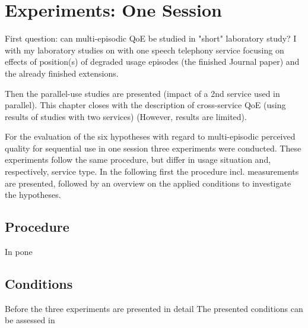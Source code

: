 \chapter{Experiments: One Session}\label{chap:lab}
\begin{chapter-abstract}
First question: can multi-episodic QoE be studied in "short" laboratory study?
I with my laboratory studies on with one speech telephony service focusing on effects of position(s) of degraded usage episodes (the finished Journal paper) and the already finished extensions.

Then the parallel-use studies are presented (impact of a 2nd service used in parallel).
This chapter closes with the description of cross-service QoE (using results of studies with two services) (However, results are limited).
\end{chapter-abstract}

For the evaluation of the six hypotheses with regard to multi-episodic perceived quality for sequential use in one session three experiments were conducted.
These experiments follow the same procedure, but differ in usage situation and, respectively, service type.
In the following first the procedure incl. measurements are presented, followed by an overview on the applied conditions to investigate the hypotheses.

\section{Procedure}
In pone 


\section{Conditions}
Before the three experiments are presented in detail
The presented conditions can be assessed in 


